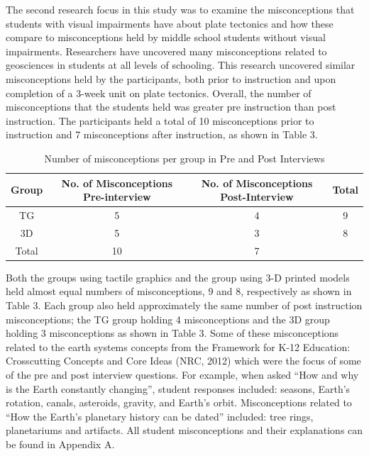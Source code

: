 \documentclass[11.5pt]{sig-alternate} %
\begin{document}
\begin{large}
The second research focus in this study was to examine the misconceptions that students with visual impairments have about plate tectonics and how these compare to misconceptions held by middle school students without visual impairments. Researchers have uncovered many misconceptions related to geosciences in students at all levels of schooling.  This research uncovered similar misconceptions held by the participants, both prior to instruction and upon completion of a 3-week unit on plate tectonics.  Overall, the number of misconceptions that the students held was greater pre instruction than post instruction.  The participants held a total of 10 misconceptions prior to instruction and 7 misconceptions after instruction, as shown in Table 3.    

\begin{table}[th]
\caption{Number of misconceptions per group in Pre and Post Interviews}
\begin{tabular}{cccc}
\hline
Group & No. of Misconceptions Pre-interview & No. of Misconceptions Post-Interview & Total \\ \hline
TG & 5 & 4 & 9 \\
3D & 5 & 3 & 8 \\
Total & 10 & 7 & \\ \hline
\end{tabular}
\end{table}

Both the groups using tactile graphics and the group using 3-D printed models held almost equal numbers of misconceptions, 9 and 8, respectively as shown in Table 3. Each group also held approximately the same number of post instruction misconceptions; the TG group holding 4 misconceptions and the 3D group holding 3 misconceptions as shown in Table 3.  Some of these misconceptions related to the earth systems concepts from the Framework for K-12 Education:  Crosscutting Concepts and Core Ideas (NRC, 2012) which were the focus of some of the pre and post interview questions.  For example, when asked “How and why is the Earth constantly changing”, student responses included:  seasons, Earth’s rotation, canals, asteroids, gravity, and Earth’s orbit.  Misconceptions related to “How the Earth’s planetary history can be dated” included:  tree rings, planetariums and artifacts.  All student misconceptions and their explanations can be found in Appendix A. 


\end{large}
\end{document}
